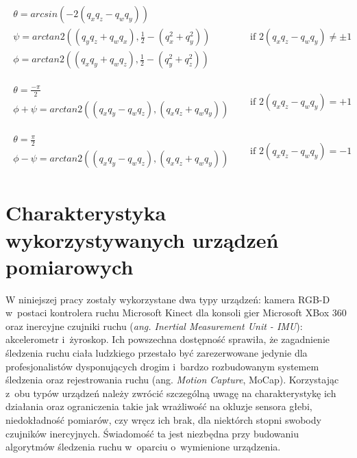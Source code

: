 \begin{equation}	
	\label{eq:appx:rot:quatToEuler}
	\begin{matrix}
		\begin{matrix}                                                   
		\theta = arcsin(-2(q_x q_z-q_w q_y))                             \\
		\psi = arctan2((q_y q_z + q_w q_x), \frac{1}{2}-(q_x^2 + q_y^2)) \\
		\phi = arctan2((q_x q_y + q_w q_z), \frac{1}{2}-(q_y^2 + q_z^2)) 
	\end{matrix} & \quad \text{if } 2(q_x q_z-q_w q_y) \ne \pm 1 \\
	& \\	
	& \\
	\begin{matrix}
		\theta = \frac{-\pi}{2}                                         \\
		\phi + \psi = arctan2((q_x q_y - q_w q_z), (q_x q_z + q_w q_y)) 
	\end{matrix} & \quad \text{if } 2(q_x q_z-q_w q_y) = +1 \\
	& \\	
	& \\
	\begin{matrix}
		\theta = \frac{\pi}{2}                                          \\
		\phi - \psi = arctan2((q_x q_y - q_w q_z), (q_x q_z + q_w q_y)) 
	\end{matrix} & \quad \text{if } 2(q_x q_z-q_w q_y) = -1 
	\end{matrix}
\end{equation}
																													
\section{Charakterystyka wykorzystywanych urządzeń pomiarowych}\label{chap:characteristics}
W niniejszej pracy zostały wykorzystane dwa typy urządzeń: kamera RGB-D w~postaci kontrolera ruchu Microsoft Kinect dla konsoli gier Microsoft XBox 360 oraz inercyjne czujniki ruchu (\emph{ang. Inertial Measurement Unit - IMU}): akcelerometr i~żyroskop. Ich powszechna dostępność sprawiła, że zagadnienie śledzenia ruchu ciała ludzkiego przestało być zarezerwowane jedynie dla profesjonalistów dysponujących drogim i~bardzo rozbudowanym systemem śledzenia oraz rejestrowania ruchu (ang. \emph{Motion Capture}, MoCap). Korzystając z~obu typów urządzeń należy zwrócić szczególną uwagę na charakterystykę ich działania oraz ograniczenia takie jak wrażliwość na okluzje sensora głebi, niedokładność pomiarów, czy wręcz ich brak, dla niektórch stopni swobody czujników inercyjnych. Świadomość ta jest niezbędna przy budowaniu algorytmów śledzenia ruchu w~oparciu o~wymienione urządzenia. 
																													
